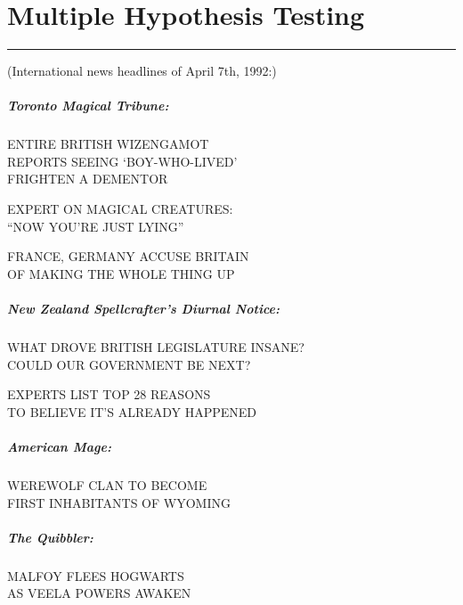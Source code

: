 \chapter{Multiple Hypothesis Testing}\label{multiple-hypothesis-testing}

\begin{center}\rule{3in}{0.4pt}\end{center}

(International news headlines of April 7th, 1992:)

\paragraph{\emph{Toronto Magical
Tribune:}}\label{toronto-magical-tribune}

ENTIRE BRITISH WIZENGAMOT\\REPORTS SEEING `BOY-WHO-LIVED'\\FRIGHTEN A
DEMENTOR

EXPERT ON MAGICAL CREATURES:\\``NOW YOU'RE JUST LYING''

FRANCE, GERMANY ACCUSE BRITAIN\\OF MAKING THE WHOLE THING UP

\paragraph{\emph{New Zealand Spellcrafter's Diurnal
Notice:}}\label{new-zealand-spellcrafters-diurnal-notice}

WHAT DROVE BRITISH LEGISLATURE INSANE?\\COULD OUR GOVERNMENT BE NEXT?

EXPERTS LIST TOP 28 REASONS\\TO BELIEVE IT'S ALREADY HAPPENED

\paragraph{\emph{American Mage:}}\label{american-mage}

WEREWOLF CLAN TO BECOME\\FIRST INHABITANTS OF WYOMING

\paragraph{\emph{The Quibbler:}}\label{the-quibbler}

MALFOY FLEES HOGWARTS\\AS VEELA POWERS AWAKEN


